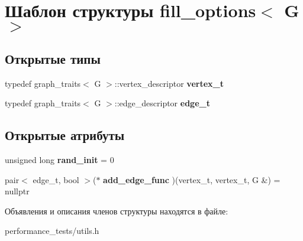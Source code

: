 \hypertarget{structfill__options}{}\section{Шаблон структуры fill\+\_\+options$<$ G $>$}
\label{structfill__options}
\subsection*{Открытые типы}
\begin{DoxyCompactItemize}
\item 
\mbox{\label{structfill__options_aa974f942fc0b1f8e3c92a347aadd8c01}} 
typedef graph\+\_\+traits$<$ G $>$\+::vertex\+\_\+descriptor {\bfseries vertex\+\_\+t}
\item 
\mbox{\label{structfill__options_a763bee3dbe7df303af1f08cf6f497ce0}} 
typedef graph\+\_\+traits$<$ G $>$\+::edge\+\_\+descriptor {\bfseries edge\+\_\+t}
\end{DoxyCompactItemize}
\subsection*{Открытые атрибуты}
\begin{DoxyCompactItemize}
\item 
\mbox{\label{structfill__options_a2e6ed57c7f804b8d7208106b7874d1a2}} 
unsigned long {\bfseries rand\+\_\+init} = 0
\item 
\mbox{\label{structfill__options_abeb37f9ba77fa19a79a59532e1b938c9}} 
pair$<$ edge\+\_\+t, bool $>$($\ast$ {\bfseries add\+\_\+edge\+\_\+func} )(vertex\+\_\+t, vertex\+\_\+t, G \&) = nullptr
\end{DoxyCompactItemize}


Объявления и описания членов структуры находятся в файле\+:\begin{DoxyCompactItemize}
\item 
performance\+\_\+tests/utils.\+h\end{DoxyCompactItemize}
